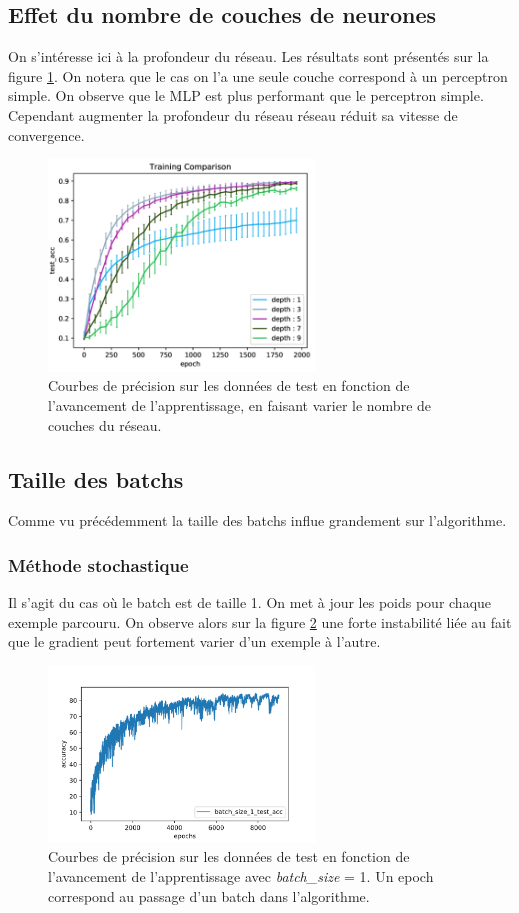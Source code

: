 \subsection{Effet du nombre de couches de neurones}
On s'intéresse ici à la profondeur du réseau. Les résultats sont présentés sur la figure \ref{MLP_profondeur}. On notera que le cas on l'a une seule couche correspond à un perceptron simple. On observe que le MLP est plus performant que le perceptron simple. Cependant augmenter la profondeur du réseau réseau réduit sa vitesse de convergence.

\begin{figure}[!h]
\centering
\includegraphics[width=200pt]{"images/MLP/MLP_profondeur"}
\caption{Courbes de précision sur les données de test en fonction de l'avancement de l'apprentissage, en faisant varier le nombre de couches du réseau.\\ }
\label{MLP_profondeur}
\end{figure}

\subsection{Taille des batchs}
Comme vu précédemment la taille des batchs influe grandement sur l'algorithme.

\subsubsection{Méthode stochastique}
Il s'agit du cas où le batch est de taille 1. On met à jour les poids pour chaque exemple parcouru. On observe alors sur la figure \ref{batch1} une forte instabilité liée au fait que le gradient peut fortement varier d'un exemple à l'autre.
\begin{figure}[!h]
\centering
\includegraphics[width=200pt]{"images/MLP/batch1"}
\caption{Courbes de précision sur les données de test en fonction de l'avancement de l'apprentissage avec \textit{batch\_size} = 1. Un epoch correspond au passage d'un batch dans l'algorithme. }
\label{batch1}
\end{figure}


